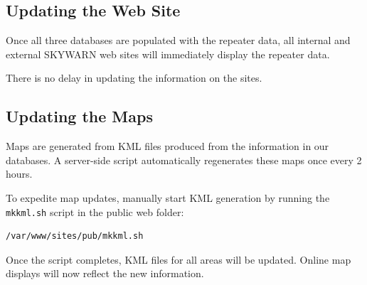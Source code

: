 \documentclass[pdflatex,letterpaper,twoside,12pt]{book}
\begin{document}
\subsection{Updating the Web Site}

Once all three databases are populated with the repeater data, all internal and external SKYWARN web sites will immediately display the repeater data.

There is no delay in updating the information on the sites.

\subsection{Updating the Maps}

Maps are generated from KML files produced from the information in our databases.  A server-side script automatically regenerates these maps once every 2 hours.

To expedite map updates, manually start KML generation by running the \texttt{mkkml.sh} script in the public web folder:

\begin{lstlisting}
/var/www/sites/pub/mkkml.sh
\end{lstlisting}

Once the script completes, KML files for all areas will be updated.  Online map displays will now reflect the new information.
\end{document}

